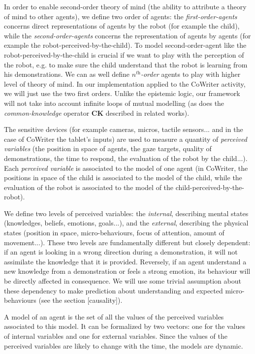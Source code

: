 \documentclass[10pt,a4paper,twocolumn]{article}
\begin{document}
In order to enable second-order theory of mind (the ability to attribute a theory of mind to other agents), we define two order of agents: the \textit{first-order-agents} concerns direct representations of agents by the robot (for example the child), while the \textit{second-order-agents} concerns the representation of agents by agents (for example the robot-perceived-by-the-child). To model second-order-agent like the robot-perceived-by-the-child is crucial if we want to play with the perception of the robot, e.g. to make sure the child understand that the robot is learning from his demonstrations. We can as well define \textit{$n^{\textit{th}}$-order} agents to play with higher level of theory of mind. In our implementation applied to the CoWriter activity, we will just use the two first orders. Unlike the epistemic logic, our framework will not take into account infinite loops of mutual modelling (as does the \textit{common-knowledge} operator \textbf{CK} described in related works). 

The sensitive devices (for example cameras, micros, tactile sensors... and in the case of CoWriter the tablet's inputs) are used to measure a quantity of \textit{perceived variables} (the position in space of agents, the gaze targets, quality of demonstrations, the time to respond, the evaluation of the robot by the child...). Each \textit{perceived variable} is associated to the model of one agent (in CoWriter, the positions in space of the child is associated to the model of the child, while the evaluation of the robot is associated to the model of the child-perceived-by-the-robot). 

We define two levels of perceived variables: the \textit{internal}, describing mental states (knowledges, beliefs, emotions, goals...), and the \textit{external}, describing the physical states (position in space, micro-behaviours, focus of attention, amount of movement...). These two levels are fundamentally different but closely dependent: if an agent is looking in a wrong direction during a demonstration, it will not assimilate the knowledge that it is provided. Reversely, if an agent understand a new knowledge from a demonstration or feels a strong emotion, its behaviour will be directly affected in consequence. We will use some trivial assumption about these dependency to make prediction about understanding and expected micro-behaviours (see the section [causality]).

A model of an agent is the set of all the values of the perceived variables associated to this model. It can be formalized by two vectors: one for the values of internal variables and one for external variables. Since the values of the perceived variables are likely to change with the time, the models are dynamic.
\end{document}

